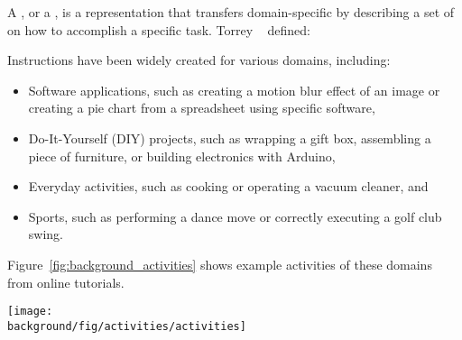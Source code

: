 A , or a , is a representation that transfers domain-specific  by describing a set of  on how to accomplish a specific task. Torrey \ea{}~\cite{Torrey:2007he} defined:
\begin{quote}
\end{quote}
%
%
Instructions have been widely created for various domains, including:

\begin{itemize}
  \item Software applications, such as creating a motion blur effect of an image or creating a pie chart from a spreadsheet using specific software,
  \item Do-It-Yourself (DIY) projects, such as wrapping a gift box, assembling a piece of furniture, or building electronics with Arduino,
  \item Everyday activities, such as cooking or operating a vacuum cleaner, and
  \item Sports, such as performing a dance move or correctly executing a golf club swing.
\end{itemize}

Figure~\ref{fig:background_activities} shows example activities of these domains from online tutorials.
\\

\begin{figure*}[b!]
  \centering
  \begin{minipage}{\textwidth}
  \texttt{[image: \\background/fig/activities/activities]}
  \caption[Example activities in tutorial domains.]{Example activities in tutorial domains:
  (a) image manipulations using a software application\footnote{``Photoshop Playbook: Selective Focus'', \url{https://youtu.be/Wh3ahxqDnyw} \copyright2016 with express permission from Adobe Systems Incorporated.},
  (b) gift wrapping, a DIY task\footnote{``How to do a Japanese Gift Wrap'' by Rouge Shop, \url{https://youtu.be/Mf3IyeMF8ug}, licensed under CC BY 2.0},
  (c) cooking, an everyday activity\footnote{``How to Cook a Turkey in a Convection Oven'' by Six Sisters' Stuff, \url{https://youtu.be/QNkwKj1Vsuc}, licensed under CC BY 2.0}, and
  (d) golf lessons in sports\footnote{``Pat's Golf Tips Top of Swing Position'' by Blue Rock Golf Academy, \url{https://youtu.be/H06o7fMQSi4}, licensed under CC BY 2.0}.
  }
  \label{fig:background_activities}
  \end{minipage}
\end{figure*}

